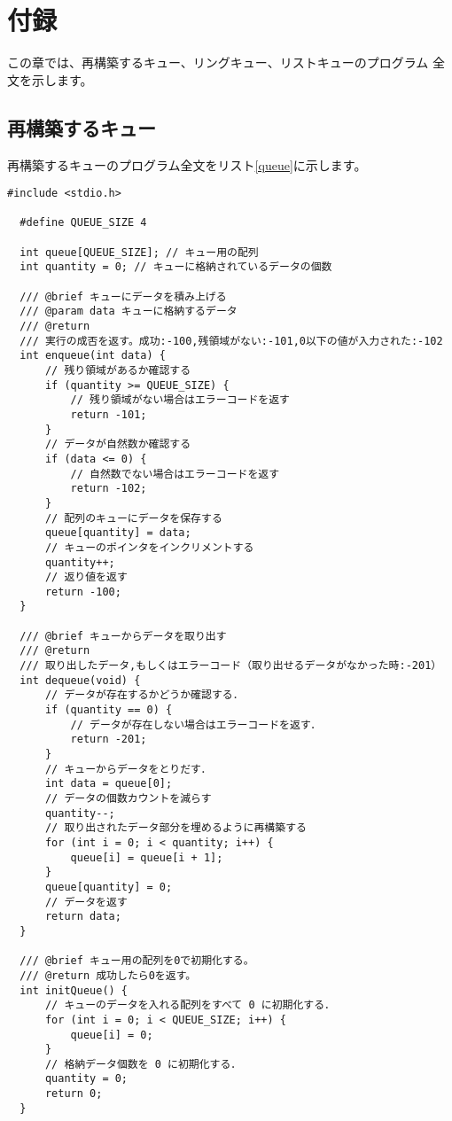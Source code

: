 \documentclass[a4j]{jarticle}
\begin{document}
\section{付録}
この章では、再構築するキュー、リングキュー、リストキューのプログラム
全文を示します。

\subsection{再構築するキュー}
再構築するキューのプログラム全文をリスト\ref{queue}に示します。

\begin{lstlisting}[caption=再構築するキューのプログラム,label=queue]
  #include <stdio.h>

  #define QUEUE_SIZE 4
  
  int queue[QUEUE_SIZE]; // キュー用の配列
  int quantity = 0; // キューに格納されているデータの個数
  
  /// @brief キューにデータを積み上げる
  /// @param data キューに格納するデータ
  /// @return
  /// 実行の成否を返す。成功:-100,残領域がない:-101,0以下の値が入力された:-102
  int enqueue(int data) {
      // 残り領域があるか確認する
      if (quantity >= QUEUE_SIZE) {
          // 残り領域がない場合はエラーコードを返す
          return -101;
      }
      // データが自然数か確認する
      if (data <= 0) {
          // 自然数でない場合はエラーコードを返す
          return -102;
      }
      // 配列のキューにデータを保存する
      queue[quantity] = data;
      // キューのポインタをインクリメントする
      quantity++;
      // 返り値を返す
      return -100;
  }
  
  /// @brief キューからデータを取り出す
  /// @return
  /// 取り出したデータ,もしくはエラーコード（取り出せるデータがなかった時:-201）
  int dequeue(void) {
      // データが存在するかどうか確認する．
      if (quantity == 0) {
          // データが存在しない場合はエラーコードを返す．
          return -201;
      }
      // キューからデータをとりだす．
      int data = queue[0];
      // データの個数カウントを減らす
      quantity--;
      // 取り出されたデータ部分を埋めるように再構築する
      for (int i = 0; i < quantity; i++) {
          queue[i] = queue[i + 1];
      }
      queue[quantity] = 0;
      // データを返す
      return data;
  }
  
  /// @brief キュー用の配列を0で初期化する。
  /// @return 成功したら0を返す。
  int initQueue() {
      // キューのデータを入れる配列をすべて 0 に初期化する．
      for (int i = 0; i < QUEUE_SIZE; i++) {
          queue[i] = 0;
      }
      // 格納データ個数を 0 に初期化する．
      quantity = 0;
      return 0;
  }
  

\end{lstlisting}
\end{document}
